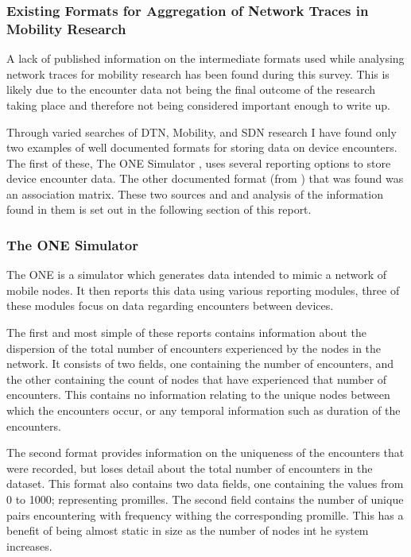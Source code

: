 \subsubsection{Existing Formats for Aggregation of Network Traces in Mobility Research}

A lack of published information on the intermediate formats used while analysing network traces for mobility research has been found during this survey. This is likely due to the encounter data not being the final outcome of the research taking place and therefore not being considered important enough to write up.

Through varied searches of DTN, Mobility, and SDN research I have found only two examples of well documented formats for storing data on device encounters. The first of these, The ONE Simulator \cite{Keranen2009}, uses several reporting options to store device encounter data. The other documented format (from \cite{Thakur2012}) that was found was an association matrix. These two sources and and analysis of the information found in them is set out in the following section of this report.

\subsubsection{The ONE Simulator \cite{Keranen2009}}
The ONE is a simulator which generates data intended to mimic a network of mobile nodes. It then reports this data using various reporting modules, three of these modules focus on data regarding encounters between devices.

The first and most simple of these reports contains information about the dispersion of the total number of encounters experienced by the nodes in the network. It consists of two fields, one containing the number of encounters, and the other containing the count of nodes that have experienced that number of encounters. This contains no information relating to the unique nodes between which the encounters occur, or any temporal information such as duration of the encounters. 

The second format provides information on the uniqueness of the encounters that were recorded, but loses detail about the total number of encounters in the dataset. This format also contains two data fields, one containing the values from 0 to 1000; representing promilles. The second field contains the number of unique pairs encountering with frequency withing the corresponding promille. This has a benefit of being almost static in size as the number of nodes int he system increases. 


